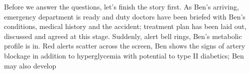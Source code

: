 Before we answer the questions, let's finish the story first. As Ben's arriving, emergency department is ready and duty doctors have been briefed with Ben's conditions, medical history and the accident; treatment plan has been laid out, discussed and agreed at this stage. Suddenly, alert bell rings, Ben's metabolic profile is in. Red alerts scatter across the screen, Ben shows the signs of artery blockage in addition to hyperglycemia with potential to type II diabetics; Ben may also develop